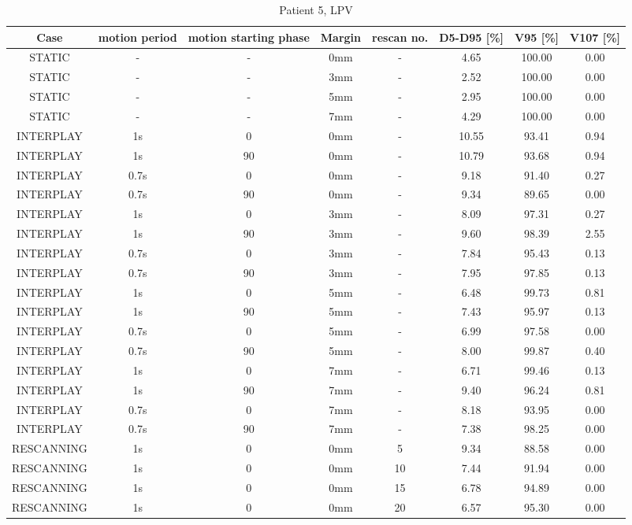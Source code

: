 \begin{table}[H]
  \centering
  \tiny
  \caption{Patient 5, LPV}
  \begin{tabular}{|c||c|c|c|c||c|c|c|}
    \hline\hline
    Case & motion period & motion starting phase & Margin & rescan no. & D5-D95 [\%] & V95 [\%] & V107 [\%] \\
    \hline 
STATIC & - & - & 0mm & - & 4.65 & 100.00 & 0.00 \\
STATIC & - & - & 3mm & - & 2.52 & 100.00 & 0.00 \\
STATIC & - & - & 5mm & - & 2.95 & 100.00 & 0.00 \\
STATIC & - & - & 7mm & - & 4.29 & 100.00 & 0.00 \\
INTERPLAY & 1s & 0 & 0mm & - & 10.55 & 93.41 & 0.94 \\
INTERPLAY & 1s & 90 & 0mm & - & 10.79 & 93.68 & 0.94 \\
INTERPLAY & 0.7s & 0 & 0mm & - & 9.18 & 91.40 & 0.27 \\
INTERPLAY & 0.7s & 90 & 0mm & - & 9.34 & 89.65 & 0.00 \\
INTERPLAY & 1s & 0 & 3mm & - & 8.09 & 97.31 & 0.27 \\
INTERPLAY & 1s & 90 & 3mm & - & 9.60 & 98.39 & 2.55 \\
INTERPLAY & 0.7s & 0 & 3mm & - & 7.84 & 95.43 & 0.13 \\
INTERPLAY & 0.7s & 90 & 3mm & - & 7.95 & 97.85 & 0.13 \\
INTERPLAY & 1s & 0 & 5mm & - & 6.48 & 99.73 & 0.81 \\
INTERPLAY & 1s & 90 & 5mm & - & 7.43 & 95.97 & 0.13 \\
INTERPLAY & 0.7s & 0 & 5mm & - & 6.99 & 97.58 & 0.00 \\
INTERPLAY & 0.7s & 90 & 5mm & - & 8.00 & 99.87 & 0.40 \\
INTERPLAY & 1s & 0 & 7mm & - & 6.71 & 99.46 & 0.13 \\
INTERPLAY & 1s & 90 & 7mm & - & 9.40 & 96.24 & 0.81 \\
INTERPLAY & 0.7s & 0 & 7mm & - & 8.18 & 93.95 & 0.00 \\
INTERPLAY & 0.7s & 90 & 7mm & - & 7.38 & 98.25 & 0.00 \\
RESCANNING & 1s & 0 & 0mm & 5 & 9.34 & 88.58 & 0.00 \\
RESCANNING & 1s & 0 & 0mm & 10 & 7.44 & 91.94 & 0.00 \\
RESCANNING & 1s & 0 & 0mm & 15 & 6.78 & 94.89 & 0.00 \\
RESCANNING & 1s & 0 & 0mm & 20 & 6.57 & 95.30 & 0.00 \\

\end{tabular}
\end{table}
